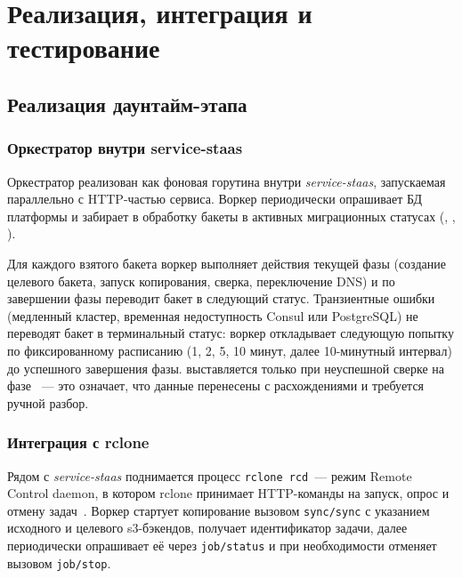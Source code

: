 \section{Реализация, интеграция и тестирование}\label{sec:implementation}

\subsection{Реализация даунтайм-этапа}\label{subsec:impl-mvp}

\subsubsection{Оркестратор внутри service-staas}\label{subsubsec:impl-orchestrator}

Оркестратор реализован как фоновая горутина внутри \textit{service-staas}, запускаемая параллельно с HTTP-частью сервиса.
Воркер периодически опрашивает БД платформы и забирает в обработку бакеты в активных миграционных статусах (, , ).

Для каждого взятого бакета воркер выполняет действия текущей фазы (создание целевого бакета, запуск копирования, сверка, переключение DNS) и по завершении фазы переводит бакет в следующий статус.
Транзиентные ошибки (медленный кластер, временная недоступность Consul или PostgreSQL) не переводят бакет в терминальный статус: воркер откладывает следующую попытку по фиксированному расписанию (1, 2, 5, 10 минут, далее 10-минутный интервал) до успешного завершения фазы.
 выставляется только при неуспешной сверке на фазе ~--- это означает, что данные перенесены с расхождениями и требуется ручной разбор.

\subsubsection{Интеграция с rclone}\label{subsubsec:impl-rclone}

Рядом с \textit{service-staas} поднимается процесс \texttt{rclone rcd}~--- режим Remote Control daemon, в котором \gls{rclone} принимает HTTP-команды на запуск, опрос и отмену задач~\cite{rclone-rc}.
Воркер стартует копирование вызовом \texttt{sync/sync} с указанием исходного и целевого \gls{s3}-бэкендов, получает идентификатор задачи, далее периодически опрашивает её через \texttt{job/status} и при необходимости отменяет вызовом \texttt{job/stop}.

